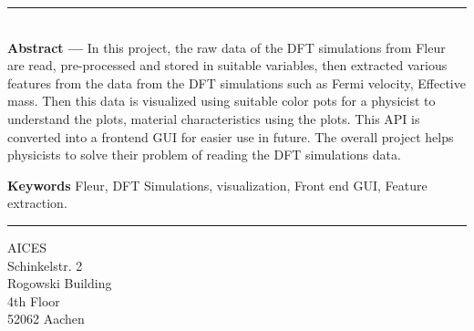 \clearpage


\thispagestyle{empty}

\vspace*{\fill}
\noindent\rule[2pt]{\textwidth}{0.5pt}\\
{\textbf{Abstract ---}}
In this project, the raw data of the DFT simulations from Fleur are read, pre-processed and stored in suitable variables, then  extracted various features from the data from the DFT simulations such as Fermi velocity, Effective mass. Then this data is visualized using suitable color pots for a physicist to understand the plots, material characteristics using the plots. This API is converted into a frontend GUI for easier use in future. The overall project helps physicists to solve their problem of reading the DFT simulations data.

{\textbf{Keywords}}
Fleur, DFT Simulations, visualization, Front end GUI, Feature extraction.
\\
\noindent\rule[2pt]{\textwidth}{0.5pt}
\begin{center}
    AICES\\
    Schinkelstr. 2\\
    Rogowski Building\\
    4th Floor\\
    52062 Aachen    
\end{center}
\vspace*{\fill}

